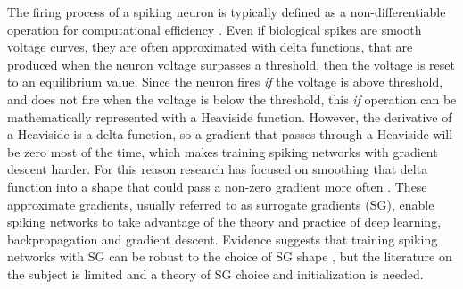The firing process of a spiking neuron is typically defined as a non-differentiable operation for computational efficiency \cite{lapique1907recherches,izhikevich2003simple}. Even if biological spikes are smooth voltage curves, they are often approximated with delta functions, that are produced when the neuron voltage surpasses a threshold, then the voltage is reset to an equilibrium value. Since the neuron fires \textit{if} the voltage is above threshold, and does not fire when the voltage is below the threshold, this \textit{if} operation can be mathematically represented with a Heaviside function.
However, the derivative of a Heaviside is a delta function, so a gradient that passes through a Heaviside will be zero most of the time, which makes training spiking networks with gradient descent harder. For this reason research has focused on smoothing that delta function into a shape that could pass a non-zero gradient more often \cite{esser2016convolutional, zenke2018superspike, lsnn}. These approximate gradients, usually referred to as surrogate gradients (SG), enable spiking networks to take advantage of the theory and practice of deep learning, backpropagation and gradient descent.  Evidence suggests that training spiking networks with SG can be robust to the choice of SG shape \cite{zenke2021remarkable}, but the literature on the subject is limited and a theory of SG choice and initialization is needed.

